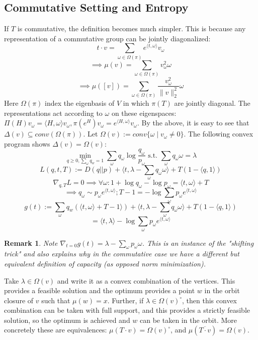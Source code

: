 \documentclass{article}
\newtheorem{remark}{Remark}
\begin{document}
\subsection{Commutative Setting and Entropy}
If $T$ is commutative, the definition becomes much simpler. This is because any representation of a commutative group can be jointly diagonalized:
\[ t \cdot v = \sum_{\omega \in \Omega(\pi)} e^{\langle t, \omega \rangle} v_{\omega}   \]
\[ \implies \mu(v) = \sum_{\omega \in \Omega(\pi)} v_{\omega}^{2} \omega    \]
\[ \implies \mu([v]) = \sum_{\omega \in \Omega(\pi)} \frac{v_{\omega}^{2}}{\|v\|_{2}^{2}} \omega  \]
Here $\Omega(\pi)$ index the eigenbasis of $V$ in which $\pi(T)$ are jointly diagonal. The representations act according to $\omega$ on these eigenspaces: $\Pi(H)v_{\omega} = \langle H, \omega \rangle v_{\omega}, \pi(e^{H})v_{\omega} = e^{\langle H, \omega \rangle} v_{\omega}$. 
By the above, it is easy to see that $\Delta(v) \subseteq conv(\Omega(\pi))$. Let $\Omega(v) := conv\{\omega \mid v_{\omega} \neq 0\}$. The following convex program shows $\Delta(v) = \Omega(v)$:
\[ \min_{q \geq 0, \sum_{\omega} q_{w} = 1} \sum_{\omega} q_{\omega} \log \frac{q_{\omega}}{p_{\omega}} \text{ s.t. } \sum_{\omega} q_{\omega} \omega = \lambda  \]
\[ L(q,t,T) := D(q||p) + \langle t, \lambda - \sum_{\omega} q_{\omega} \omega \rangle + T (1 - \langle q, 1 \rangle)    \]
\[ \nabla_{q,T} L = 0 \implies \forall \omega: 1 + \log q_{\omega} - \log p_{\omega} = \langle t, \omega \rangle + T  \]
\[ \implies q_{\omega} \sim p_{\omega} e^{\langle t, \omega \rangle}; T - 1 = -\log \sum_{\omega} p_{\omega} e^{\langle t, \omega \rangle}  \]
\[ g(t) := \sum_{\omega} q_{w} (\langle t, \omega \rangle + T - 1 \rangle) + \langle t, \lambda - \sum_{\omega} q_{\omega} \omega \rangle + T(1 - \langle q, 1 \rangle)  \]
\[ = \langle t, \lambda \rangle - \log \sum_{\omega} p_{\omega} e^{\langle t, \omega \rangle}    \]
\begin{remark}
Note $\nabla_{t=0} g(t) = \lambda - \sum_{\omega} p_{\omega} \omega$. This is an instance of the "shifting trick" and also explains why in the commutative case we have a different but equivalent definition of capacity (as opposed norm minimization). 
\end{remark}

Take $\lambda \in \Omega(v)$ and write it as a convex combination of the vertices. This provides a feasible solution and the optimum provides a point $w$ in the orbit closure of $v$ such that $\mu(w) = x$. Further, if $\lambda \in \Omega(v)^{\circ}$, then this convex combination can be taken with full support, and this provides a strictly feasible solution, so the optimum is achieved and $w$ can be taken in the orbit. More concretely these are equivalences: $\mu(T \cdot v) = \Omega(v)^{\circ}$, and $\mu(\overline{T \cdot v}) = \Omega(v)$. 
\end{document}
